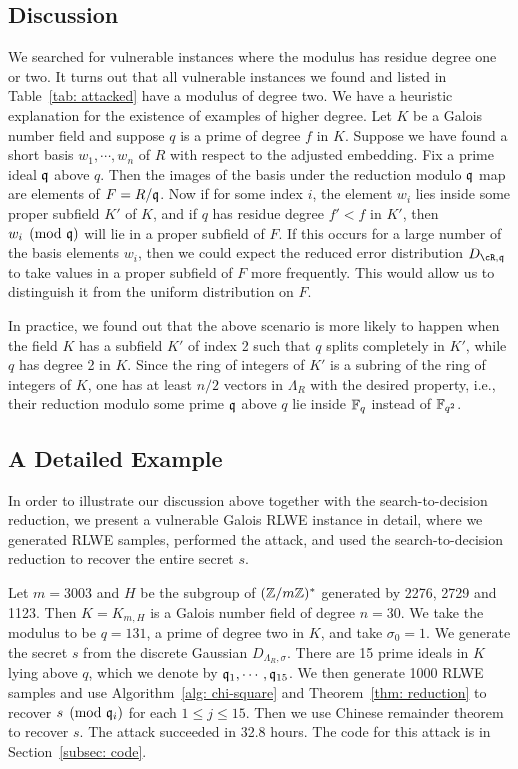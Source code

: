 \documentclass[envcountsame]{llncs}
\begin{document}
\subsection{Discussion}

We searched for vulnerable instances where the modulus has residue degree one or two. It turns out that all vulnerable instances we found and listed in Table~\ref{tab: attacked} have a modulus of degree two.  We have a heuristic explanation for the existence of examples of higher degree.  Let $K$  be a Galois number field and suppose $q$ is a prime of degree $f$ in $K$. Suppose we have found a short basis $w_1,\cdots, w_n$ of $R$ with respect to the adjusted embedding. Fix a prime ideal $\mathfrak{q}$ above $q$. Then the images of the basis under the reduction modulo $\mathfrak{q}$ map are elements of $F = R/\mathfrak{q}$. Now if for some index $i$, the element $w_i$ lies inside some proper subfield $K'$ of $K$, and if $q$ has residue degree $f' < f$ in $K'$, then $w_i \pmod{\mathfrak{q}}$ will lie in a proper subfield of $F$. If this occurs for a large number of the basis elements $w_i$, then we could  expect the reduced error distribution $D_{\cR,\fq}$ to take values in a proper subfield of $F$ more frequently. This would allow us to distinguish it from the uniform distribution on $F$.

In practice, we found out that the above scenario is more likely to happen when the field $K$ has a subfield $K'$ of index 2 such that $q$ splits completely in $K'$, while $q$ has degree 2 in $K$. Since the ring of integers of $K'$ is a subring of the ring of integers of $K$, one has at least $n/2$ vectors in $\Lambda_R$ with the desired property, i.e., their reduction modulo some prime $\mathfrak{q}$ above $q$ lie inside $\mathbb{F}_q$ instead of $\mathbb{F}_{q^2}$.



\subsection{A Detailed Example} \label{subsec: detailed}
In order to illustrate our discussion above together with the search-to-decision reduction, we present a vulnerable Galois RLWE instance in detail, where we generated RLWE samples, performed the attack, and used the search-to-decision reduction to recover the entire secret $s$.


Let $m = 3003$ and $H$ be the subgroup of $(\mathbb{Z}/m\mathbb{Z})^*$ generated by 2276, 2729 and 1123. Then $K = K_{m,H}$ is a Galois number field of degree $n = 30$. We take the modulus to be $q = 131$, a prime of degree two in $K$, and take $\sigma_0 = 1$. We generate the secret $s$ from the discrete Gaussian $D_{\Lambda_R, \sigma}$.  There are 15 prime ideals in $K$ lying above $q$, which we denote by $\mathfrak{q}_1, \cdots, \mathfrak{q}_{15}$. We then generate 1000 RLWE samples and use Algorithm~\ref{alg: chi-square} and Theorem~\ref{thm: reduction} to recover $s \pmod {\mathfrak{q}_i}$ for each $1 \leq j \leq 15$. Then we use Chinese remainder theorem to recover $s$. The attack succeeded in 32.8 hours. The code for this attack is in Section~\ref{subsec: code}.
\end{document}

